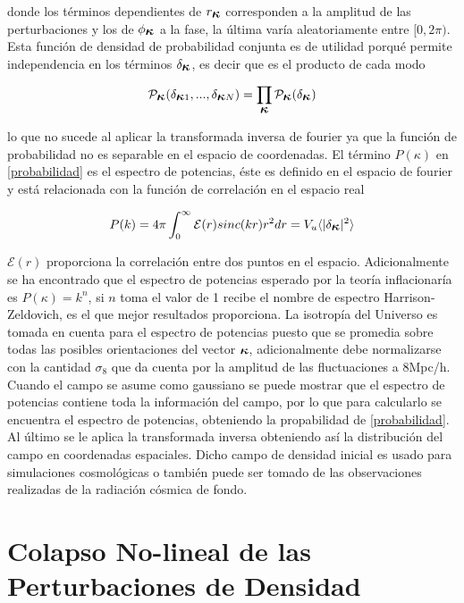 donde los términos dependientes de $r_{\mbox{\boldmath$\kappa$}}$ corresponden a la amplitud de las perturbaciones 
y los de $\phi_{\mbox{\boldmath$\kappa$}}$ a la fase, la última varía aleatoriamente entre $[0,2\pi)$. 
Esta función de densidad de probabilidad conjunta es de utilidad porqué permite independencia en los términos 
$\delta_{\mbox{\boldmath$\kappa$}}$, es decir que es el producto de cada modo 

\[
\mathcal{P}_{\mbox{\boldmath$\kappa$}}(\delta_{\mbox{\boldmath$\kappa$}1},...,\delta_{\mbox{\boldmath$\kappa$}N})=
\prod_{\mbox{\boldmath$\kappa$}}\mathcal{P}_{\mbox{\boldmath$\kappa$}}(\delta_{\mbox{\boldmath$\kappa$}})
\]

lo que no sucede al aplicar la transformada inversa de fourier ya que la función de probabilidad no es separable en el espacio de
coordenadas. El término $P(\kappa)$ en \ref{probabilidad} es el espectro de potencias, éste es definido en el 
espacio de fourier y está relacionada con la función de correlación en el espacio real

\[
P(k) = 4\pi\int_0^\infty \mathcal{E} (r)sinc(kr)r^2dr = V_u  \langle|\delta_{\mbox{\boldmath$\kappa$}}|^2\rangle
\]

$\mathcal{E} (r)$ proporciona la correlación entre dos puntos en el espacio. Adicionalmente se ha encontrado
que el espectro de potencias esperado por la teoría inflacionaría es $P(\kappa)= k^n$, si $n$ toma
el valor de 1 recibe el nombre de espectro Harrison-Zeldovich, es el que mejor 
resultados proporciona. La isotropía del Universo es tomada en cuenta
para el espectro de potencias puesto que se promedia sobre todas las posibles orientaciones del vector 
${\mbox{\boldmath$\kappa$}}$, adicionalmente debe normalizarse con la cantidad $\sigma_8$ que da cuenta
por la amplitud de las fluctuaciones a $8$Mpc/h. 
Cuando el campo se asume como gaussiano se puede mostrar 
que el espectro de potencias contiene toda la información del campo, por lo que
para calcularlo se encuentra el espectro de potencias,
obteniendo la propabilidad de \ref{probabilidad}. Al último se le aplica la transformada inversa
obteniendo así la distribución del campo en coordenadas espaciales. Dicho campo de densidad inicial es usado
para simulaciones cosmológicas o también puede ser tomado de las observaciones realizadas
de la radiación cósmica de fondo. 

\section{Colapso No-lineal de las Perturbaciones de Densidad }

